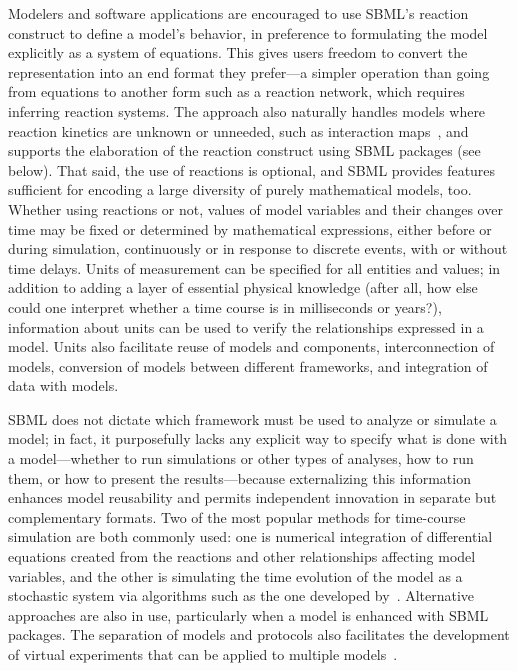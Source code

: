 \documentclass{sbml-paper}
\begin{document}
Modelers and software applications are encouraged to use SBML's reaction construct to define a model's behavior, in preference to formulating the model explicitly as a system of equations.  This gives users freedom to convert the representation into an end format they prefer---a simpler operation than going from equations to another form such as a reaction network, which requires inferring reaction systems.  The approach also naturally handles models where reaction kinetics are unknown or unneeded, such as interaction maps~\citep[e.g.,][]{thiele2013community}, and supports the elaboration of the reaction construct using SBML packages (see below).  That said, the use of reactions is optional, and SBML provides features sufficient for encoding a large diversity of purely mathematical models, too.  Whether using reactions or not, values of model variables and their changes over time may be fixed or determined by mathematical expressions, either before or during simulation, continuously or in response to discrete events, with or without time delays.  Units of measurement can be specified for all entities and values; in addition to adding a layer of essential physical knowledge (after all, how else could one interpret whether a time course is in milliseconds or years?), information about units can be used to verify the relationships expressed in a model.  Units also facilitate reuse of models and components, interconnection of models, conversion of models between different frameworks, and integration of data with models.

SBML does not dictate which framework must be used to analyze or simulate a model; in fact, it purposefully lacks any explicit way to specify what is done with a model---whether to run simulations or other types of analyses, how to run them, or how to present the results---because externalizing this information enhances model reusability and permits independent innovation in separate but complementary formats.  Two of the most popular methods for time-course simulation are both commonly used: one is numerical integration of differential equations created from the reactions and other relationships affecting model variables, and the other is simulating the time evolution of the model as a stochastic system via algorithms such as the one developed by~\cite{gillespie1977exact}.  Alternative approaches are also in use, particularly when a model is enhanced with SBML packages.  The separation of models and protocols also facilitates the development of virtual experiments that can be applied to multiple models~\citep{Cooper2015call}.
\end{document}
